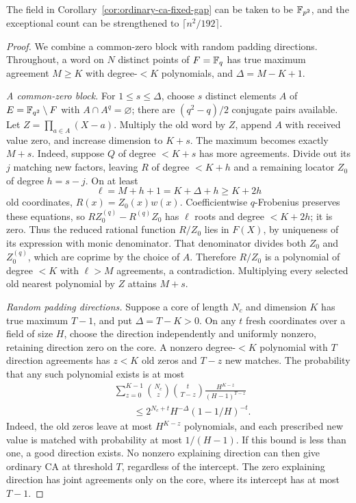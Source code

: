 \begin{proposition}\label{prop:ordinary-ca-field-degree}
The field in Corollary~\ref{cor:ordinary-ca-fixed-gap} can be taken to be
$\mathbb F_{p^2}$, and the exceptional count can be strengthened to
$\lceil n^2/192\rceil$.
\end{proposition}
\begin{proof}
We combine a common-zero block with random padding directions. Throughout, a word on $N$ distinct points
of $F=\mathbb F_q$ has true maximum agreement $M\ge K$ with degree-$<K$
polynomials, and $\Delta=M-K+1$.

\emph{A common-zero block.}
For $1\le s\le\Delta$, choose $s$ distinct elements $A$ of
$E=\mathbb F_{q^2}\setminus F$ with $A\cap A^q=\varnothing$; there are
$(q^2-q)/2$ conjugate pairs available. Let $Z=\prod_{a\in A}(X-a)$.
Multiply the old word by $Z$, append $A$ with received value zero,
and increase dimension to $K+s$. The maximum becomes exactly $M+s$.
Indeed, suppose $Q$ of degree $<K+s$ has more agreements. Divide out
its $j$ matching new factors, leaving $R$ of degree $<K+h$ and a
remaining locator $Z_0$ of degree $h=s-j$. On at least
\[
 \ell=M+h+1=K+\Delta+h\ge K+2h
\]
old coordinates, $R(x)=Z_0(x)w(x)$. Coefficientwise $q$-Frobenius
preserves these equations, so $RZ_0^{(q)}-R^{(q)}Z_0$ has $\ell$
roots and degree $<K+2h$; it is zero. Thus the reduced rational
function $R/Z_0$ lies in $F(X)$, by uniqueness of its expression
with monic denominator. That denominator divides both $Z_0$ and
$Z_0^{(q)}$, which are coprime by the choice of $A$. Therefore $R/Z_0$
is a polynomial of degree $<K$ with $\ell>M$ agreements, a contradiction.
Multiplying every selected old nearest polynomial by $Z$ attains $M+s$.

\emph{Random padding directions.}
Suppose a core of length $N_c$ and dimension $K$ has true maximum
$T-1$, and put $\Delta=T-K>0$. On any $t$ fresh coordinates over a
field of size $H$, choose the direction independently and uniformly
nonzero, retaining direction zero on the core. A nonzero degree-$<K$
polynomial with $T$ direction agreements has $z<K$ old zeros and
$T-z$ new matches. The probability that any such polynomial exists is
at most
\begin{align*}
 &\sum_{z=0}^{K-1}\binom{N_c}z\binom t{T-z}
       \frac{H^{K-z}}{(H-1)^{T-z}}\\
 &\hspace{2em}\le 2^{N_c+t}H^{-\Delta}(1-1/H)^{-t}.
\end{align*}
Indeed, the old zeros leave at most $H^{K-z}$ polynomials, and each
prescribed new value is matched with probability at most $1/(H-1)$.
If this bound is less than one, a good direction exists. No nonzero
explaining direction can then give ordinary CA at threshold $T$,
regardless of the intercept. The zero explaining direction has joint
agreements only on the core, where its intercept has at most $T-1$.


\end{proof}
